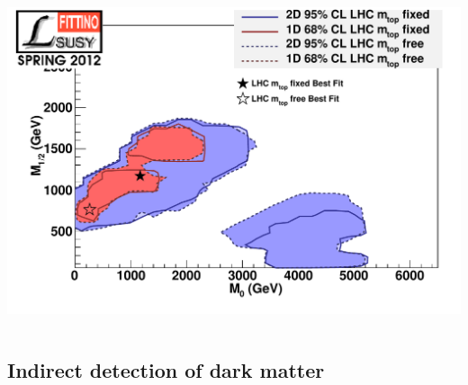 \documentclass[xcolor=dvipsnames]{beamer}
\begin{document}
\begin{frame}
\begin{columns}
\centering
\includegraphics[width=\textwidth]{Fittino}
\end{columns}

\end{frame}


\subsection{Indirect detection of dark matter}
\end{document}
